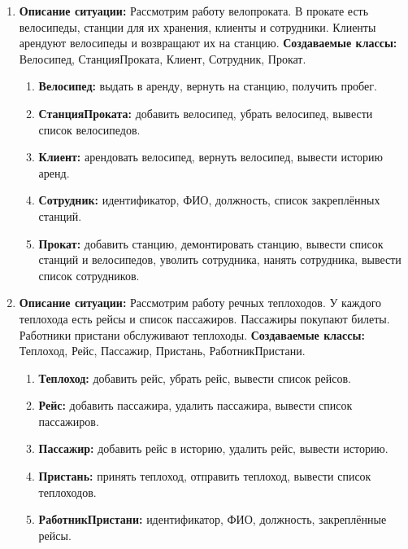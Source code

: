 \begin{enumerate}
\item
\textbf{Описание ситуации:}
Рассмотрим работу велопроката. В прокате есть велосипеды, станции для их хранения, 
клиенты и сотрудники. Клиенты арендуют велосипеды и возвращают их на станцию.
\textbf{Создаваемые классы:} Велосипед, СтанцияПроката, Клиент, Сотрудник, Прокат.
\begin{enumerate}
    \item \textbf{Велосипед:} выдать в аренду, вернуть на станцию, получить пробег.
    \item \textbf{СтанцияПроката:} добавить велосипед, убрать велосипед, вывести список велосипедов.
    \item \textbf{Клиент:} арендовать велосипед, вернуть велосипед, вывести историю аренд.
    \item \textbf{Сотрудник:} идентификатор, ФИО, должность, список закреплённых станций.
    \item \textbf{Прокат:} добавить станцию, демонтировать станцию, 
    вывести список станций и велосипедов, уволить сотрудника, нанять сотрудника, вывести список сотрудников.
\end{enumerate}

\item
\textbf{Описание ситуации:}
Рассмотрим работу речных теплоходов. У каждого теплохода есть рейсы и список пассажиров. 
Пассажиры покупают билеты. Работники пристани обслуживают теплоходы.
\textbf{Создаваемые классы:} Теплоход, Рейс, Пассажир, Пристань, РаботникПристани.
\begin{enumerate}
    \item \textbf{Теплоход:} добавить рейс, убрать рейс, вывести список рейсов.
    \item \textbf{Рейс:} добавить пассажира, удалить пассажира, вывести список пассажиров.
    \item \textbf{Пассажир:} добавить рейс в историю, удалить рейс, вывести историю.
    \item \textbf{Пристань:} принять теплоход, отправить теплоход, вывести список теплоходов.
    \item \textbf{РаботникПристани:} идентификатор, ФИО, должность, закреплённые рейсы.
\end{enumerate}


\end{enumerate}

